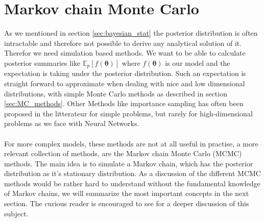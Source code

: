 \section{Markov chain Monte Carlo}\label{sec:MCMC}
 As we mentioned in section \ref{sec:bayesian_stat} the posterior distribution is often intractable and therefore not possible to derive any analytical solution of it. Therefor we need simulation based methods. We want to be able to calculate posterior summaries like $\mathbb{E}_p\left[f(\boldsymbol{\theta})\right]$ where $f(\boldsymbol{\theta})$ is our model and the expectation is taking under the posterior distribution. Such an expectation is straight forward to approximate when dealing with nice and low dimensional distributions, with simple Monte Carlo methods as described in section \ref{sec:MC_methods}. Other Methods like importance sampling has often been proposed in the litterateur for simple problems, but rarely for high-dimensional problems as we face with Neural Networks.
 \\
 \\
 For more complex models, these methods are not at all useful in practise, a more relevant collection of methods, are the
 Markov chain Monte Carlo (MCMC) methods. The main idea is to simulate a Markov chain, which has the posterior distribution as it's stationary distribution. As a discussion of the different MCMC methods would be rather hard to understand without the fundamental knowledge of Markov chains, we will summarize the most important concepts in the next section. The curious reader is encouraged to see \cite{lawler2006introduction} for a deeper discussion of this subject.
 
